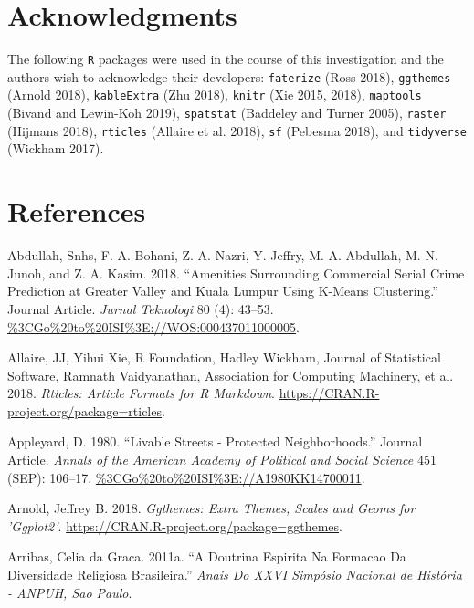 \documentclass[smallextended]{svjour3}       %
\begin{document}
\hypertarget{acknowledgments}{%
\section{Acknowledgments}\label{acknowledgments}}

The following \texttt{R} packages were used in the course of this
investigation and the authors wish to acknowledge their developers:
\texttt{faterize} (Ross 2018), \texttt{ggthemes} (Arnold 2018),
\texttt{kableExtra} (Zhu 2018), \texttt{knitr} (Xie 2015, 2018),
\texttt{maptools} (Bivand and Lewin-Koh 2019), \texttt{spatstat}
(Baddeley and Turner 2005), \texttt{raster} (Hijmans 2018),
\texttt{rticles} (Allaire et al. 2018), \texttt{sf} (Pebesma 2018), and
\texttt{tidyverse} (Wickham 2017).

\hypertarget{references}{%
\section*{References}\label{references}}

\hypertarget{refs}{}
\leavevmode\hypertarget{ref-Abdullah2018amenities}{}%
Abdullah, Snhs, F. A. Bohani, Z. A. Nazri, Y. Jeffry, M. A. Abdullah, M.
N. Junoh, and Z. A. Kasim. 2018. ``Amenities Surrounding Commercial
Serial Crime Prediction at Greater Valley and Kuala Lumpur Using K-Means
Clustering.'' Journal Article. \emph{Jurnal Teknologi} 80 (4): 43--53.
\url{\%3CGo\%20to\%20ISI\%3E://WOS:000437011000005}.

\leavevmode\hypertarget{ref-Allaire2018rticles}{}%
Allaire, JJ, Yihui Xie, R Foundation, Hadley Wickham, Journal of
Statistical Software, Ramnath Vaidyanathan, Association for Computing
Machinery, et al. 2018. \emph{Rticles: Article Formats for R Markdown}.
\url{https://CRAN.R-project.org/package=rticles}.

\leavevmode\hypertarget{ref-Appleyard1980livable}{}%
Appleyard, D. 1980. ``Livable Streets - Protected Neighborhoods.''
Journal Article. \emph{Annals of the American Academy of Political and
Social Science} 451 (SEP): 106--17.
\url{\%3CGo\%20to\%20ISI\%3E://A1980KK14700011}.

\leavevmode\hypertarget{ref-Arnold2018}{}%
Arnold, Jeffrey B. 2018. \emph{Ggthemes: Extra Themes, Scales and Geoms
for 'Ggplot2'}. \url{https://CRAN.R-project.org/package=ggthemes}.

\leavevmode\hypertarget{ref-Arribas2011doutrina}{}%
Arribas, Celia da Graca. 2011a. ``A Doutrina Espirita Na Formacao Da
Diversidade Religiosa Brasileira.'' \emph{Anais Do XXVI Simpósio
Nacional de História - ANPUH, Sao Paulo}.
\end{document}
